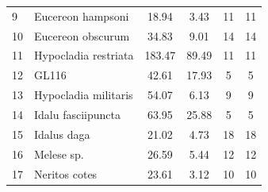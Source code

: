 \documentclass[12pt,a4paper,pdftex]{article}
\begin{document}
\begin{table}[h]
\begin{tabular}{llcccc}
		9            & Eucereon hampsoni            & 18.94                                                & 3.43                                            & 11                                                        & 11                                                         \\
		10           & Eucereon obscurum            & 34.83                                                & 9.01                                            & 14                                                        & 14                                                         \\
		11           & Hypocladia restriata                        & 183.47                                               & 89.49                                           & 11                                                        & 11                                                         \\
		12           & GL116                        & 42.61                                                & 17.93                                           & 5                                                         & 5                                                          \\
		13           & Hypocladia militaris         & 54.07                                                & 6.13                                            & 9                                                         & 9                                                          \\
		14           & Idalu fasciipuncta           & 63.95                                                & 25.88                                           & 5                                                         & 5                                                          \\
		15           & Idalus daga                & 21.02                                                & 4.73                                            & 18                                                        & 18                                                         \\
		16           & Melese sp.             & 26.59                                                & 5.44                                            & 12                                                        & 12                                                         \\
		17           & Neritos cotes               & 23.61                                                & 3.12                                            & 10                                                        & 10                                                         \\

\end{tabular}
\end{table}
\end{document}
